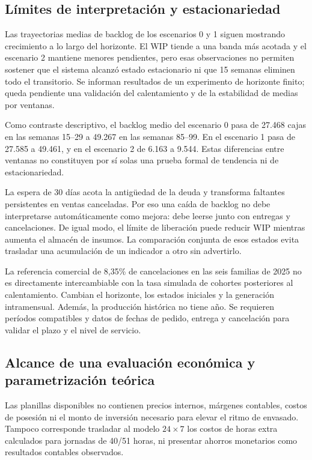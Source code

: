 \documentclass[11pt, a4paper]{article}
\newcommand{\BacklogTempranoBase}{27.468}
\newcommand{\BacklogTardioBase}{49.267}
\newcommand{\BacklogTempranoSinPanico}{27.585}
\newcommand{\BacklogTardioSinPanico}{49.461}
\newcommand{\BacklogTempranoIntegral}{6.163}
\newcommand{\BacklogTardioIntegral}{9.544}
\begin{document}

\subsection{Límites de interpretación y estacionariedad}
Las trayectorias medias de backlog de los escenarios 0 y 1 siguen mostrando crecimiento a lo largo del horizonte. El WIP tiende a una banda más acotada y el escenario 2 mantiene menores pendientes, pero esas observaciones no permiten sostener que el sistema alcanzó estado estacionario ni que 15 semanas eliminen todo el transitorio. Se informan resultados de un experimento de horizonte finito; queda pendiente una validación del calentamiento y de la estabilidad de medias por ventanas.

Como contraste descriptivo, el backlog medio del escenario 0 pasa de \BacklogTempranoBase{} cajas en las semanas 15--29 a \BacklogTardioBase{} en las semanas 85--99. En el escenario 1 pasa de \BacklogTempranoSinPanico{} a \BacklogTardioSinPanico{}, y en el escenario 2 de \BacklogTempranoIntegral{} a \BacklogTardioIntegral{}. Estas diferencias entre ventanas no constituyen por sí solas una prueba formal de tendencia ni de estacionariedad.

La espera de 30 días acota la antigüedad de la deuda y transforma faltantes persistentes en ventas canceladas. Por eso una caída de backlog no debe interpretarse automáticamente como mejora: debe leerse junto con entregas y cancelaciones. De igual modo, el límite de liberación puede reducir WIP mientras aumenta el almacén de insumos. La comparación conjunta de esos estados evita trasladar una acumulación de un indicador a otro sin advertirlo.

La referencia comercial de 8,35\% de cancelaciones en las seis familias de 2025 no es directamente intercambiable con la tasa simulada de cohortes posteriores al calentamiento. Cambian el horizonte, los estados iniciales y la generación intramensual. Además, la producción histórica no tiene año. Se requieren períodos compatibles y datos de fechas de pedido, entrega y cancelación para validar el plazo y el nivel de servicio.

\subsection{Alcance de una evaluación económica y parametrización teórica}
Las planillas disponibles no contienen precios internos, márgenes contables, costos de posesión ni el monto de inversión necesario para elevar el ritmo de envasado. Tampoco corresponde trasladar al modelo $24\times 7$ los costos de horas extra calculados para jornadas de 40/51 horas, ni presentar ahorros monetarios como resultados contables observados.
\end{document}
